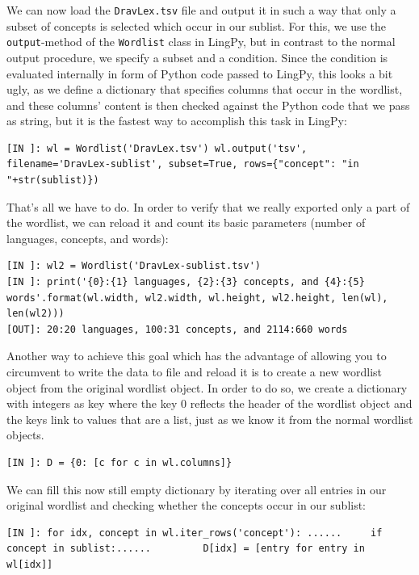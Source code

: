 \documentclass[
  english,
  a4paper,
  oneside,tablecaptionabove
]{scrbook}
\newcommand{\passthrough}[1]{#1}
\begin{document}
We can now load the \passthrough{\lstinline!DravLex.tsv!} file and
output it in such a way that only a subset of concepts is selected which
occur in our sublist. For this, we use the
\passthrough{\lstinline!output!}-method of the
\passthrough{\lstinline!Wordlist!} class in LingPy, but in contrast to
the normal output procedure, we specify a subset and a condition. Since
the condition is evaluated internally in form of Python code passed to
LingPy, this looks a bit ugly, as we define a dictionary that specifies
columns that occur in the wordlist, and these columns' content is then
checked against the Python code that we pass as string, but it is the
fastest way to accomplish this task in LingPy:

\begin{lstlisting}
[IN ]: wl = Wordlist('DravLex.tsv') wl.output('tsv', filename='DravLex-sublist', subset=True, rows={"concept": "in "+str(sublist)})
\end{lstlisting}

That's all we have to do. In order to verify that we really exported
only a part of the wordlist, we can reload it and count its basic
parameters (number of languages, concepts, and words):

\begin{lstlisting}
[IN ]: wl2 = Wordlist('DravLex-sublist.tsv') 
[IN ]: print('{0}:{1} languages, {2}:{3} concepts, and {4}:{5} words'.format(wl.width, wl2.width, wl.height, wl2.height, len(wl), len(wl2))) 
[OUT]: 20:20 languages, 100:31 concepts, and 2114:660 words
\end{lstlisting}

Another way to achieve this goal which has the advantage of allowing you
to circumvent to write the data to file and reload it is to create a new
wordlist object from the original wordlist object. In order to do so, we
create a dictionary with integers as key where the key 0 reflects the
header of the wordlist object and the keys link to values that are a
list, just as we know it from the normal wordlist objects.

\begin{lstlisting}
[IN ]: D = {0: [c for c in wl.columns]}
\end{lstlisting}

We can fill this now still empty dictionary by iterating over all
entries in our original wordlist and checking whether the concepts occur
in our sublist:

\begin{lstlisting}
[IN ]: for idx, concept in wl.iter_rows('concept'): ......     if concept in sublist:......         D[idx] = [entry for entry in wl[idx]] 
\end{lstlisting}
\end{document}
